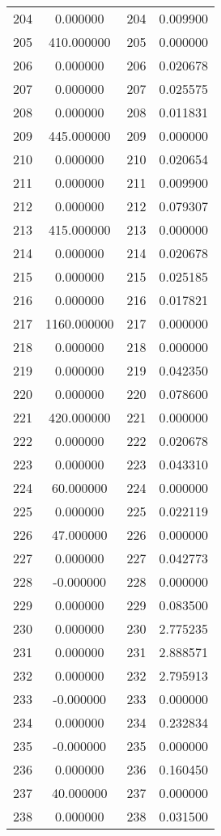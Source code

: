 \documentclass[12pt]{article}
\begin{document}
\begin{longtable}{@{}cccc@{}}
204 & 0.000000 & 204 & 0.009900 \\
205 & 410.000000 & 205 & 0.000000 \\
206 & 0.000000 & 206 & 0.020678 \\
207 & 0.000000 & 207 & 0.025575 \\
208 & 0.000000 & 208 & 0.011831 \\
209 & 445.000000 & 209 & 0.000000 \\
210 & 0.000000 & 210 & 0.020654 \\
211 & 0.000000 & 211 & 0.009900 \\
212 & 0.000000 & 212 & 0.079307 \\
213 & 415.000000 & 213 & 0.000000 \\
214 & 0.000000 & 214 & 0.020678 \\
215 & 0.000000 & 215 & 0.025185 \\
216 & 0.000000 & 216 & 0.017821 \\
217 & 1160.000000 & 217 & 0.000000 \\
218 & 0.000000 & 218 & 0.000000 \\
219 & 0.000000 & 219 & 0.042350 \\
220 & 0.000000 & 220 & 0.078600 \\
221 & 420.000000 & 221 & 0.000000 \\
222 & 0.000000 & 222 & 0.020678 \\
223 & 0.000000 & 223 & 0.043310 \\
224 & 60.000000 & 224 & 0.000000 \\
225 & 0.000000 & 225 & 0.022119 \\
226 & 47.000000 & 226 & 0.000000 \\
227 & 0.000000 & 227 & 0.042773 \\
228 & -0.000000 & 228 & 0.000000 \\
229 & 0.000000 & 229 & 0.083500 \\
230 & 0.000000 & 230 & 2.775235 \\
231 & 0.000000 & 231 & 2.888571 \\
232 & 0.000000 & 232 & 2.795913 \\
233 & -0.000000 & 233 & 0.000000 \\
234 & 0.000000 & 234 & 0.232834 \\
235 & -0.000000 & 235 & 0.000000 \\
236 & 0.000000 & 236 & 0.160450 \\
237 & 40.000000 & 237 & 0.000000 \\
238 & 0.000000 & 238 & 0.031500 \\

\end{longtable}
\end{document}
